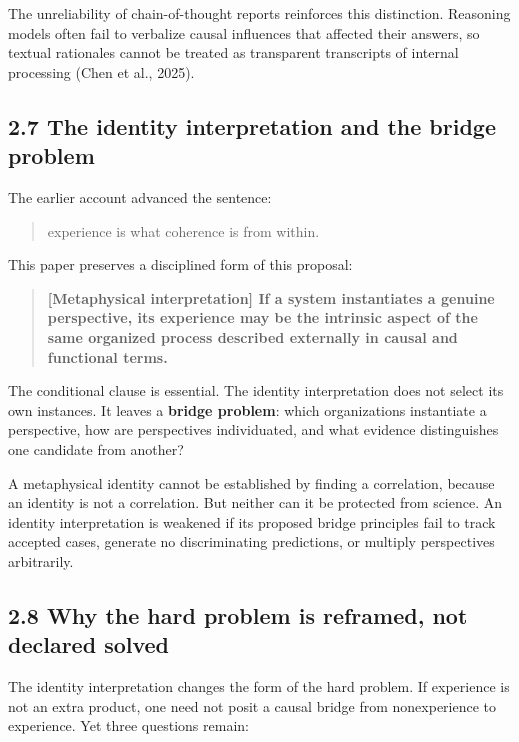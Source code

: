 \documentclass[
  11pt,
]{article}
\begin{document}
The unreliability of chain-of-thought reports reinforces this
distinction. Reasoning models often fail to verbalize causal influences
that affected their answers, so textual rationales cannot be treated as
transparent transcripts of internal processing (Chen et al., 2025).

\subsection{2.7 The identity interpretation and the bridge
problem}\label{the-identity-interpretation-and-the-bridge-problem}

The earlier account advanced the sentence:

\begin{quote}
experience is what coherence is from within.
\end{quote}

This paper preserves a disciplined form of this proposal:

\begin{quote}
\textbf{{[}Metaphysical interpretation{]} If a system instantiates a
genuine perspective, its experience may be the intrinsic aspect of the
same organized process described externally in causal and functional
terms.}
\end{quote}

The conditional clause is essential. The identity interpretation does
not select its own instances. It leaves a \textbf{bridge problem}: which
organizations instantiate a perspective, how are perspectives
individuated, and what evidence distinguishes one candidate from
another?

A metaphysical identity cannot be established by finding a correlation,
because an identity is not a correlation. But neither can it be
protected from science. An identity interpretation is weakened if its
proposed bridge principles fail to track accepted cases, generate no
discriminating predictions, or multiply perspectives arbitrarily.

\subsection{2.8 Why the hard problem is reframed, not declared
solved}\label{why-the-hard-problem-is-reframed-not-declared-solved}

The identity interpretation changes the form of the hard problem. If
experience is not an extra product, one need not posit a causal bridge
from nonexperience to experience. Yet three questions remain:
\end{document}
